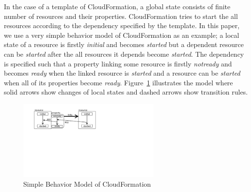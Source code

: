 \documentclass[12pt]{report}
\begin{document}
In the case of a template of CloudFormation, a global state consists
of finite number of resources and their properties. CloudFormation
tries to start the all resources according to the dependency specified by
the template. In this paper, we use a very simple behavior model of
CloudFormation as an example; a local state of a resource is firstly
{\it initial} and becomes {\it started} but a dependent resource can
be {\it started} after the all resources it depends become {\it started}.
The dependency is specified such that a property linking some resource
is firstly {\it notready} and becomes {\it ready} when the linked
resource is {\it started} and a resource can be {\it started} when all
of its properties become {\it ready}.  Figure~\ref{fig:R01R02}
illustrates the model where solid arrows show changes of local states
and dashed arrows show transition rules.
\begin{figure}
\centering
\includegraphics[height=4cm,natwidth=720,natheight=405,clip,trim=50 260 300 20]{R01R02.png}
\caption{Simple Behavior Model of CloudFormation}
\label{fig:R01R02}
\end{figure}
\end{document}
